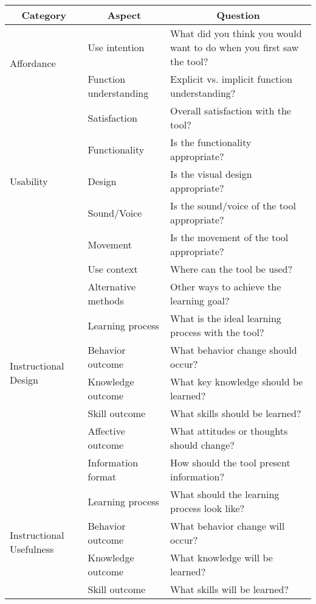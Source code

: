 \begin{table*}[hbt!]
\centering
\scriptsize
\begin{tabular}{p{3cm}p{3cm}p{6cm}}
\hline
\multicolumn{1}{c}{\textbf{Category}} & \multicolumn{1}{c}{\textbf{Aspect}} & \multicolumn{1}{c}{\textbf{Question}} \\
\hline
\multirow{2}{*}{Affordance} & Use intention & What did you think you would want to do when you first saw the tool? \\
\cline{2-3}
 & Function understanding & Explicit vs. implicit function understanding? \\
\hline
\multirow{5}{*}{Usability} & Satisfaction & Overall satisfaction with the tool? \\
\cline{2-3}
 & Functionality & Is the functionality appropriate? \\
\cline{2-3}
 & Design & Is the visual design appropriate? \\
\cline{2-3}
 & Sound/Voice & Is the sound/voice of the tool appropriate? \\
\cline{2-3}
 & Movement & Is the movement of the tool appropriate? \\
\hline
\multirow{8}{*}{Instructional Design} & Use context & Where can the tool be used? \\
\cline{2-3}
 & Alternative methods & Other ways to achieve the learning goal? \\
\cline{2-3}
 & Learning process & What is the ideal learning process with the tool? \\
\cline{2-3}
 & Behavior outcome & What behavior change should occur? \\
\cline{2-3}
 & Knowledge outcome & What key knowledge should be learned? \\
\cline{2-3}
 & Skill outcome & What skills should be learned? \\
\cline{2-3}
 & Affective outcome & What attitudes or thoughts should change? \\
\cline{2-3}
 & Information format & How should the tool present information? \\
\hline
\multirow{11}{*}{Instructional Usefulness} & Learning process & What should the learning process look like? \\
\cline{2-3}
 & Behavior outcome & What behavior change will occur? \\
\cline{2-3}
 & Knowledge outcome & What knowledge will be learned? \\
\cline{2-3}
 & Skill outcome & What skills will be learned? \\

\end{tabular}
\end{table*}
